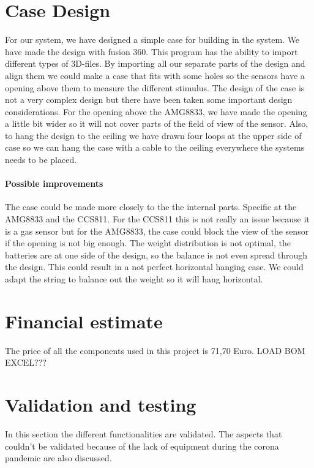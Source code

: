 \documentclass[11pt,a4paper]{article}
\begin{document}
\section{Case Design}
For our system, we have designed a simple case for building in the system. We have made the design with fusion 360. This program has the ability to import different types of 3D-files. By importing all our separate parts of the design and align them we could make a case that fits with some holes so the sensors have a opening above them to measure the different stimulus. The design of the case is not a very complex design but there have been taken some important design considerations. For the opening above the AMG8833, we have made the opening a little bit wider so it will not cover parts of the field of view of the sensor. Also, to hang the design to the ceiling we have drawn four loops at the upper side of case so we can hang the case with a cable to the ceiling everywhere the systems needs to be placed.


\paragraph{Possible improvements}
The case could be made more closely to the the internal parts. Specific at the AMG8833 and the CCS811. For the CCS811 this is not  really an issue because it is a gas sensor but for the AMG8833, the case could block the view of the sensor if the opening is not big enough. The weight distribution is not optimal, the batteries are at one side of the design, so the balance is not even spread through the design. This could result in a not perfect horizontal hanging case. We could adapt the string to balance out the weight so it will hang horizontal.


\section{Financial estimate}
The price of all the components used in this project is 71,70 Euro.  
LOAD BOM EXCEL??? 

\section{Validation and testing}
In this section the different functionalities are validated. The aspects that couldn't be validated because of the lack of equipment during the corona pandemic are also discussed. 
\end{document}
